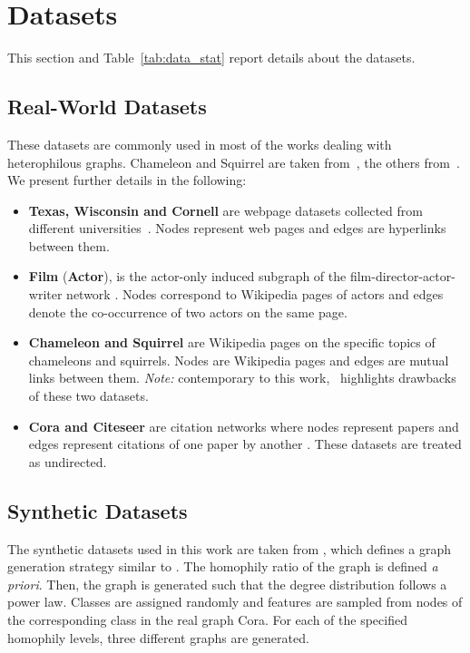 \documentclass[conference]{IEEEtran}
\begin{document}
\newpage
\section{Datasets}
\label{app:datasets}

This section and Table~\ref{tab:data_stat} report details about the datasets.

\subsection{Real-World Datasets}
\label{sec:real_world_datasets}
These datasets are commonly used in most of the works dealing with heterophilous graphs.
Chameleon and Squirrel are taken from~\cite{simplifying-code}, the others from~\cite{geom-gcn-code}.
We present further details in the following:
\begin{itemize}[leftmargin=.5cm]
    \item \textbf{Texas, Wisconsin and Cornell} are webpage datasets collected from different universities~\cite{webkbproject}. Nodes represent web pages and edges are hyperlinks between them. \item \textbf{Film} (\textbf{Actor}), is the actor-only induced subgraph of the film-director-actor-writer network \cite{tang_social_2009}. Nodes correspond to Wikipedia pages of actors and edges denote the co-occurrence of two actors on the same page. \item \textbf{Chameleon and Squirrel} are Wikipedia pages on the specific topics of chameleons and squirrels. Nodes are Wikipedia pages and edges are mutual links between them. 
\textit{Note:} contemporary to this work,~\cite{platonov2023critical} highlights drawbacks of these two datasets.
    \item \textbf{Cora and Citeseer} are citation networks where nodes represent papers and edges represent citations of one paper by another \cite{sen_collective_2008, namata_query_2012}. These datasets are treated as undirected.
\end{itemize}

\subsection{Synthetic Datasets}
\label{app:dataset:syn}
The synthetic datasets used in this work are taken from \cite{zhu_beyond_2020}, which defines a graph generation strategy similar to \cite{abu_mixhop_2019}. The homophily ratio of the graph is defined \textit{a priori}. Then, the graph is generated such that the degree distribution follows a power law. Classes are assigned randomly and features are sampled from nodes of the corresponding class in the real graph Cora. For each of the specified homophily levels, three different graphs are generated.
\end{document}
